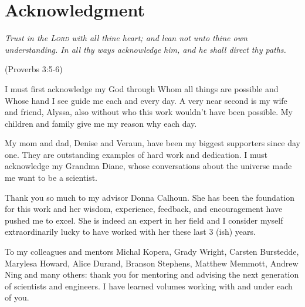 \chapter*{Acknowledgment}

\begin{center}
{\em Trust in the \textsc{Lord} with all thine heart; and lean not unto thine own understanding. In all thy ways acknowledge him, and he shall direct thy paths.}

(Proverbs 3:5-6)
\end{center}

I must first acknowledge my God through Whom all things are possible and Whose hand I see guide me each and every day. A very near second is my wife and friend, Alyssa, also without who this work wouldn't have been possible. My children and family give me my reason why each day.

My mom and dad, Denise and Veraun, have been my biggest supporters since day one. They are outstanding examples of hard work and dedication. I must acknowledge my Grandma Diane, whose conversations about the universe made me want to be a scientist.

Thank you so much to my advisor Donna Calhoun. She has been the foundation for this work and her wisdom, experience, feedback, and encouragement have pushed me to excel. She is indeed an expert in her field and I consider myself extraordinarily lucky to have worked with her these last 3 (ish) years.

To my colleagues and mentors Michal Kopera, Grady Wright, Carsten Burstedde, Marylesa Howard, Alice Durand, Branson Stephens, Matthew Memmott, Andrew Ning and many others: thank you for mentoring and advising the next generation of scientists and engineers. I have learned volumes working with and under each of you.


